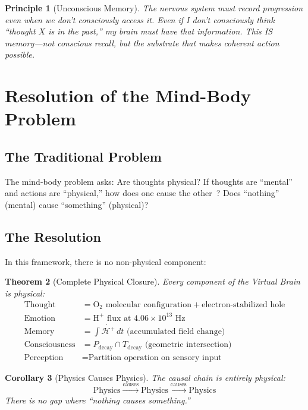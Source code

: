 \documentclass[aps,prd,twocolumn,superscriptaddress,floatfix,nofootinbib]{revtex4-2}
\newtheorem{theorem}{Theorem}[section]
\newtheorem{corollary}[theorem]{Corollary}
\newtheorem{principle}[theorem]{Principle}
\theoremstyle{remark}
\newcommand{\Hfield}{\mathcal{H}^+}
\newcommand{\Pdecay}{P_{\mathrm{decay}}}
\newcommand{\Tdecay}{T_{\mathrm{decay}}}
\begin{document}
\begin{principle}[Unconscious Memory]
\label{princ:unconscious_memory}
The nervous system must record progression even when we don't consciously access it. Even if I don't consciously think ``thought $X$ is in the past,'' my brain must have that information. This IS memory---not conscious recall, but the substrate that makes coherent action possible.
\end{principle}

\section{Resolution of the Mind-Body Problem}
\label{sec:mind_body}

\subsection{The Traditional Problem}

The mind-body problem asks: Are thoughts physical? If thoughts are ``mental'' and actions are ``physical,'' how does one cause the other~\cite{kim2005physicalism,papineau2002thinking}? Does ``nothing'' (mental) cause ``something'' (physical)?

\subsection{The Resolution}

In this framework, there is no non-physical component:

\begin{theorem}[Complete Physical Closure]
\label{thm:physical_closure}
Every component of the Virtual Brain is physical:
\begin{align}
\text{Thought} &= \text{O}_2 \text{ molecular configuration} + \text{electron-stabilized hole} \\
\text{Emotion} &= \text{H}^+ \text{ flux at } 4.06 \times 10^{13} \text{ Hz} \\
\text{Memory} &= \int \dot{\Hfield} \, dt \text{ (accumulated field change)} \\
\text{Consciousness} &= \Pdecay \cap \Tdecay \text{ (geometric intersection)} \\
\text{Perception} &= \text{Partition operation on sensory input}
\end{align}
\end{theorem}

\begin{corollary}[Physics Causes Physics]
\label{cor:physics_physics}
The causal chain is entirely physical:
\begin{equation}
\text{Physics} \xrightarrow{\text{causes}} \text{Physics} \xrightarrow{\text{causes}} \text{Physics}
\end{equation}
There is no gap where ``nothing causes something.''
\end{corollary}
\end{document}
